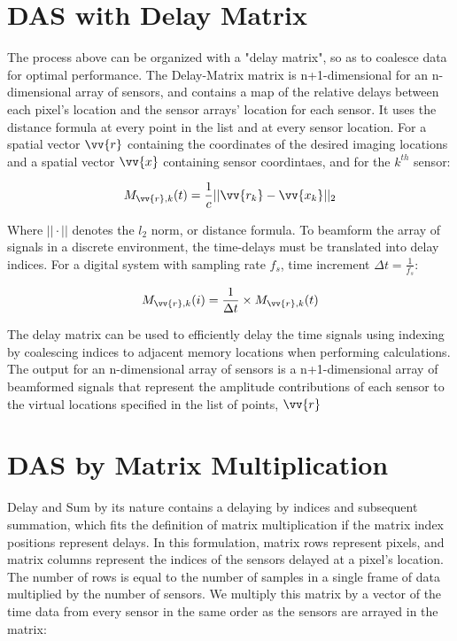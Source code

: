 \section{DAS with Delay Matrix}
\label{chapter2:delay_matrix}

The process above can be organized with a "delay matrix", so as to coalesce data for optimal performance. The Delay-Matrix matrix is n+1-dimensional for an n-dimensional array of sensors, and contains a map of the relative delays between each pixel's location and the sensor arrays' location for each sensor. It uses the distance formula at every point in the list and at every sensor location. For a spatial vector $\vv{r}$ containing the coordinates of the desired imaging locations and a spatial vector $\vv{x}$ containing sensor coordintaes, and for the $k^{th}$ sensor: 

\begin{equation}
    M_{\vv{r},k}(t) = \frac{1}{c} || \vv{r_k} - \vv{x_k}||_2
\end{equation}

Where $||\cdot||$ denotes the $l_2$ norm, or distance formula. To beamform the array of signals in a discrete environment, the time-delays must be translated into delay indices. For a digital system with sampling rate $f_s$, time increment $\Delta{t} = \frac{1}{f_s}$:

\begin{equation}
    M_{\vv{r},k}(i) = \frac{1}{\Delta{t}} \times M_{\vv{r},k}(t)    
\end{equation}

The delay matrix can be used to efficiently delay the time signals using indexing by coalescing indices to adjacent memory locations when performing calculations. The output for an n-dimensional array of sensors is a n+1-dimensional array of beamformed signals that represent the amplitude contributions of each sensor to the virtual locations specified in the list of points, $\vv{r}$

\section{DAS by Matrix Multiplication}
\label{chapter2:mmult_das}

Delay and Sum by its nature contains a delaying by indices and subsequent summation, which fits the definition of matrix multiplication if the matrix index positions represent delays. In this formulation, matrix rows represent pixels, and matrix columns represent the indices of the sensors delayed at a pixel's location. The number of rows is equal to the number of samples in a single frame of data multiplied by the number of sensors. We multiply this matrix by a vector of the time data from every sensor in the same order as the sensors are arrayed in the matrix:

